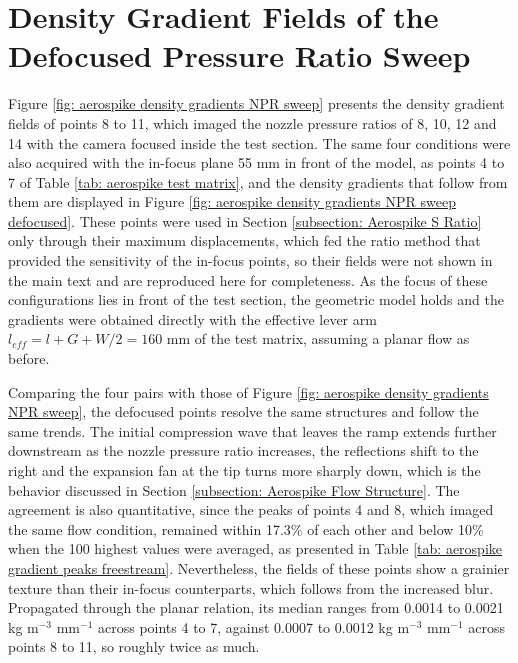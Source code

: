 \chapter{Density Gradient Fields of the Defocused Pressure Ratio Sweep}
\label{Appendix: aerospike defocused NPR sweep}

\par Figure \ref{fig: aerospike density gradients NPR sweep} presents the density gradient fields of points 8 to 11, which imaged the nozzle pressure ratios of 8, 10, 12 and 14 with the camera focused inside the test section. The same four conditions were also acquired with the in-focus plane 55 mm in front of the model, as points 4 to 7 of Table \ref{tab: aerospike test matrix}, and the density gradients that follow from them are displayed in Figure \ref{fig: aerospike density gradients NPR sweep defocused}. These points were used in Section \ref{subsection: Aerospike S Ratio} only through their maximum displacements, which fed the ratio method that provided the sensitivity of the in-focus points, so their fields were not shown in the main text and are reproduced here for completeness. As the focus of these configurations lies in front of the test section, the geometric model holds and the gradients were obtained directly with the effective lever arm $l_{eff} = l + G + W/2 = 160$ mm of the test matrix, assuming a planar flow as before.

\par Comparing the four pairs with those of Figure \ref{fig: aerospike density gradients NPR sweep}, the defocused points resolve the same structures and follow the same trends. The initial compression wave that leaves the ramp extends further downstream as the nozzle pressure ratio increases, the reflections shift to the right and the expansion fan at the tip turns more sharply down, which is the behavior discussed in Section \ref{subsection: Aerospike Flow Structure}. The agreement is also quantitative, since the peaks of points 4 and 8, which imaged the same flow condition, remained within 17.3\% of each other and below 10\% when the 100 highest values were averaged, as presented in Table \ref{tab: aerospike gradient peaks freestream}. Nevertheless, the fields of these points show a grainier texture than their in-focus counterparts, which follows from the increased blur. Propagated through the planar relation, its median ranges from 0.0014 to 0.0021 kg m$^{-3}$ mm$^{-1}$ across points 4 to 7, against 0.0007 to 0.0012 kg m$^{-3}$ mm$^{-1}$ across points 8 to 11, so roughly twice as much.

